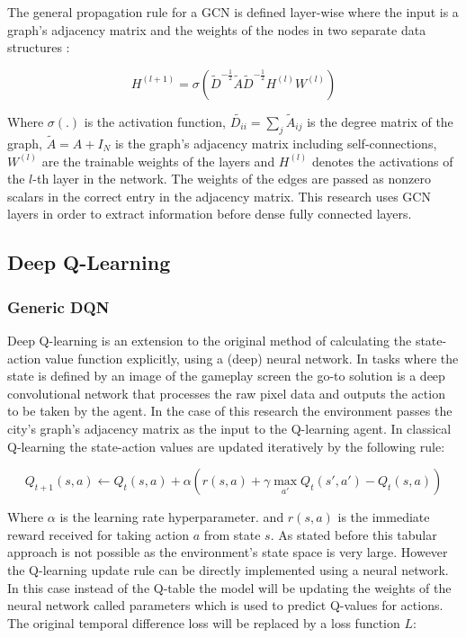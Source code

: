 \documentclass[
]{elteikthesis}[2023/04/10]
\begin{document}
The general propagation rule for a GCN is defined layer-wise where
the input is a graph's adjacency matrix and the weights of the nodes
in two separate data structures \cite{kipf2016semi}: 

\begin{equation}
H^{(l+1)}=\sigma\left(\tilde{D}^{-\frac{1}{2}}\tilde{A}\tilde{D}^{-\frac{1}{2}}H^{(l)}W^{(l)}\right)
\end{equation}

Where $\sigma(.)$ is the activation function, $\tilde{D_{ii}}=\sum_{j}\tilde{A}_{ij}$
is the degree matrix of the graph, $\tilde{A}=A+I_{N}$ is the graph's
adjacency matrix including self-connections, $W^{(l)}$ are the trainable
weights of the layers and $H^{(l)}$ denotes the activations of the
$l$-th layer in the network. The weights of the edges are passed
as nonzero scalars in the correct entry in the adjacency matrix. This
research uses GCN layers in order to extract information before dense
fully connected layers. 

\subsection{Deep Q-Learning }

\subsubsection*{Generic DQN}

Deep Q-learning is an extension to the original method of calculating
the state-action value function explicitly, using a (deep) neural
network. In tasks where the state is defined by an image of the gameplay
screen the go-to solution is a deep convolutional network that processes
the raw pixel data and outputs the action to be taken by the agent.
In the case of this research the environment passes the city's graph's
adjacency matrix as the input to the Q-learning agent. In classical
Q-learning the state-action values are updated iteratively by the
following rule:

\begin{equation}
Q_{t+1}\left(s,a\right)\leftarrow Q_{t}\left(s,a\right)+\alpha\left(r\left(s,a\right)+\gamma\max_{a'}Q_{t}\left(s\prime,a\prime\right)-Q_{t}\left(s,a\right)\right)
\end{equation}

Where $\alpha$ is the learning rate hyperparameter. and $r(s,a)$
is the immediate reward received for taking action $a$ from state
$s$. As stated before this tabular approach is not possible as the
environment's state space is very large. However the Q-learning update
rule can be directly implemented using a neural network. In this case
instead of the Q-table the model will be updating the weights of
the neural network called parameters which is used to predict Q-values 
for actions. The original temporal difference loss will be replaced by 
a loss function $L$:
\end{document}
